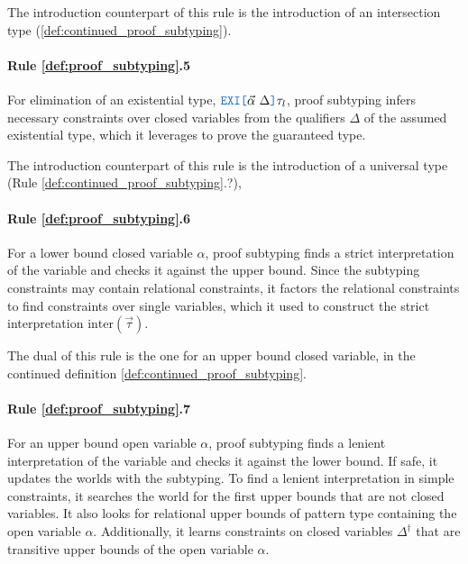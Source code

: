 \documentclass[acmsmall]{acmart}
\theoremstyle{definition}
\begin{document}
The introduction counterpart of this rule is the introduction of an intersection type (\ref{def:continued_proof_subtyping}).

\paragraph{Rule \ref{def:proof_subtyping}.5}
For elimination of an existential type, $\obj{EXI[}\vec{\alpha}\ \Delta\obj{]}\tau_l$, proof subtyping 
infers necessary constraints over closed variables from the qualifiers $\Delta$ of the assumed existential type, 
which it leverages to prove the guaranteed type. 



The introduction counterpart of this rule is the introduction of a universal type (Rule \ref{def:continued_proof_subtyping}.?), 


\paragraph{Rule \ref{def:proof_subtyping}.6}
For a lower bound closed variable $\alpha$, proof subtyping
finds a strict interpretation of the variable
and checks it against the upper bound. Since the subtyping constraints
may contain relational constraints, it factors the relational constraints
to find constraints over single variables, which it used to construct the strict
interpretation $\text{inter}(\vec{\tau})$.  

The dual of this rule is the one for an upper bound closed variable, 
in the continued definition \ref{def:continued_proof_subtyping}.

\paragraph{Rule \ref{def:proof_subtyping}.7}
For an upper bound open variable $\alpha$, proof subtyping
finds a lenient interpretation of the variable and checks it against the lower bound.
If safe, it updates the worlds with the subtyping.
To find a lenient interpretation in simple constraints, it searches the world for 
the first upper bounds that are not closed variables. It also looks for relational
upper bounds of pattern type containing the open variable $\alpha$.
Additionally, it learns constraints on closed variables $\Delta^\dagger$ 
that are transitive upper bounds of the open variable $\alpha$.  
\end{document}
